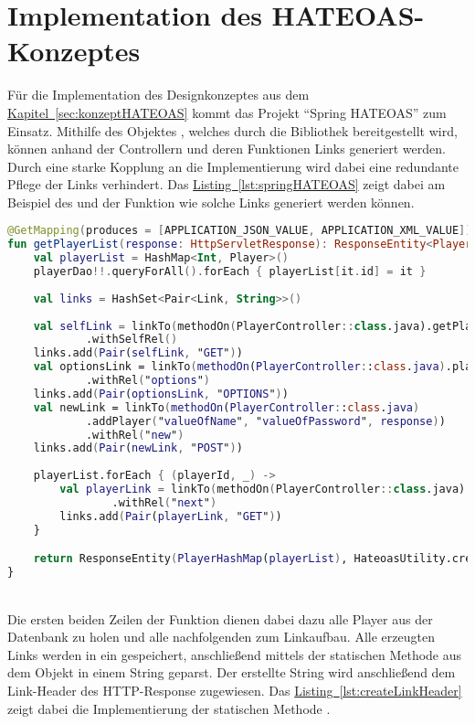 \section{Implementation des HATEOAS-Konzeptes}
Für die Implementation des Designkonzeptes aus dem \hyperref[sec:konzeptHATEOAS]{Kapitel~\ref{sec:konzeptHATEOAS}} kommt das Projekt \enquote{Spring HATEOAS} zum Einsatz. Mithilfe des Objektes , welches durch die Bibliothek bereitgestellt wird, können anhand der Controllern und deren Funktionen Links generiert werden. Durch eine starke Kopplung an die Implementierung wird dabei eine redundante Pflege der Links verhindert. Das \hyperref[lst:springHATEOAS]{Listing~\ref{lst:springHATEOAS}} zeigt dabei am Beispiel des  und der Funktion  wie solche Links generiert werden können.\\
\begin{lstlisting}[style=lstStyleFramed, language=Kotlin, caption={Linkaufbau mithilfe des Projektes \enquote{Spring HATEOAS}}, label=lst:springHATEOAS, float]
@GetMapping(produces = [APPLICATION_JSON_VALUE, APPLICATION_XML_VALUE])
fun getPlayerList(response: HttpServletResponse): ResponseEntity<PlayerHashMap> {
	val playerList = HashMap<Int, Player>()
	playerDao!!.queryForAll().forEach { playerList[it.id] = it }
	
	val links = HashSet<Pair<Link, String>>()
	
	val selfLink = linkTo(methodOn(PlayerController::class.java).getPlayerList(response))
			.withSelfRel()
	links.add(Pair(selfLink, "GET"))
	val optionsLink = linkTo(methodOn(PlayerController::class.java).playerOptions(response))
			.withRel("options")
	links.add(Pair(optionsLink, "OPTIONS"))
	val newLink = linkTo(methodOn(PlayerController::class.java)
			.addPlayer("valueOfName", "valueOfPassword", response))
			.withRel("new")
	links.add(Pair(newLink, "POST"))
	
	playerList.forEach { (playerId, _) ->
		val playerLink = linkTo(methodOn(PlayerController::class.java).getPlayerById(playerId, response))
				.withRel("next")
		links.add(Pair(playerLink, "GET"))
	}

	return ResponseEntity(PlayerHashMap(playerList), HateoasUtility.createLinkHeader(links), OK)
}
\end{lstlisting}
\\
Die ersten beiden Zeilen der Funktion dienen dabei dazu alle Player aus der Datenbank zu holen und alle nachfolgenden zum Linkaufbau. Alle erzeugten Links werden in ein  gespeichert, anschließend mittels der statischen Methode  aus dem Objekt  in einem String geparst. Der erstellte String wird anschließend dem Link-Header des \gls{HTTP}-Response zugewiesen. Das \hyperref[lst:createLinkHeader]{Listing~\ref{lst:createLinkHeader}} zeigt dabei die Implementierung der statischen Methode .\\
